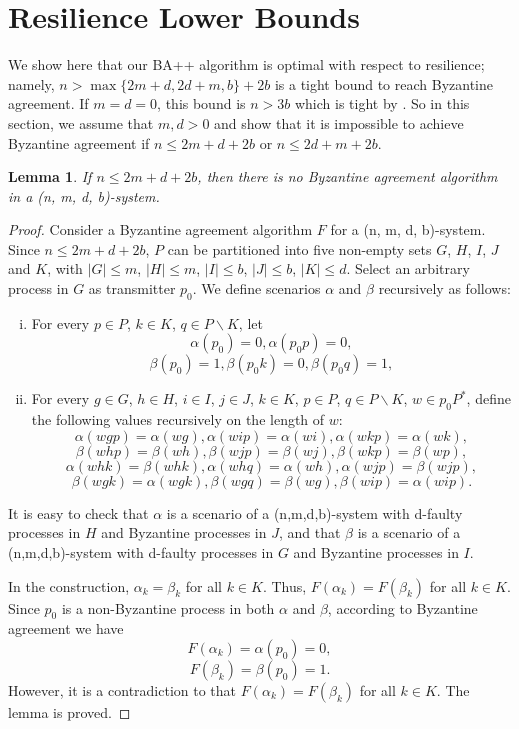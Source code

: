 \documentclass[11pt,conference,compsoc,onecolumn,romanappendices]{IEEEtran}
\newcommand{\nocomma}{}
\newenvironment{enumerateroman}{\begin{enumerate}[i.] }{\end{enumerate}}
\newtheorem{lemma}{Lemma}
\begin{document}
\section{Resilience Lower Bounds}\label{sec-resilience}

We show here that our BA++ algorithm is optimal  with
respect to resilience; namely, $n > \max \{2 m + d, 2 d + m, b\}+ 2 b$ is a
tight bound to reach Byzantine agreement. If $m = d = 0$, this bound is $n > 3 b$ which is tight by
\cite{lamport1982byzantine}. So in this section, we assume that $m, d > 0$ and
show that it is
impossible to achieve Byzantine agreement if $n \leqslant 2 m + d + 2 b$ or $n \leqslant 2 d + m + 2 b$.


\begin{lemma}\label{lemma-impsb1}
  If $n \leqslant 2 m + d + 2 b$, then there is no Byzantine
  agreement algorithm in a (n, m, d, b)-system.
\end{lemma}

\begin{proof}
  Consider a Byzantine agreement algorithm $F$ for a
  (n, m, d, b)-system. Since $n \leqslant 2 m + d + 2 b$, $P$ can be
  partitioned into five non-empty sets $G$, $H$, $I$, $J$ and $K$, with $| G |
  \leqslant m$, $| H | \leqslant m$, $| I | \leqslant b$, $| J | \leqslant b$,
  $| K | \leqslant d$. Select an arbitrary process in $G$ as transmitter
  $p_0$. We define scenarios $\alpha$ and $\beta$ recursively as follows:
  \smallskip
  \begin{enumerateroman}
    \item For every $p \in P$, $k \in K$, $q \in P \backslash K$, let
    \[ \alpha (p_0) = 0, \alpha (p_0 p) = 0, \]
    \[ \beta (p_0) = 1, \beta (p_0 k) = 0, \beta (p_0 q) = 1, \]
    \item For every $g \in G$, $h \in H$, $i \in I$, $j \in J$, $k \in K$, $p
    \in P$, $q \in P \backslash K$, $w \in p_0 P^{\ast}$, define the following values
    recursively on the length of $w$:
    \[ \alpha (w g p) = \alpha (w g) \nocomma, \alpha (w i p) = \alpha (w i),
       \alpha (w k p) = \alpha (w k), \]
    \[ \beta (w h p) = \beta (w h) \nocomma, \beta (w j p) = \beta (w j),
       \beta (w k p) = \beta (w p), \]
    \[ \alpha (w h k) = \beta (w h k) \nocomma, \alpha (w h q) = \alpha (w h),
       \alpha (w j p) = \beta (w j p) \nocomma, \text{} \]
    \[ \beta (w g k) = \alpha (w g k), \beta (w g q) = \beta (w g), \beta (w i
       p) = \alpha (w i p) . \]
  \end{enumerateroman}
  It is easy to check that $\alpha$ is a scenario of a (n,m,d,b)-system with d-faulty processes in $H$ and Byzantine processes in $J$, and that $\beta$ is a scenario of a (n,m,d,b)-system with d-faulty processes in $G$ and Byzantine processes in $I$.

  In the construction, $\alpha_k = \beta_k$ for all $k \in K$. Thus, $F (\alpha_k) = F (\beta_k)$ for all $k \in K$.
  Since $p_0$ is a non-Byzantine process in both $\alpha$ and $\beta$, according to Byzantine agreement we have
  \[ F (\alpha_k) = \alpha (p_0) = 0, \]
  \[ F (\beta_k) = \beta (p_0) = 1. \]
However, it is a contradiction to that $F (\alpha_k) = F (\beta_k)$ for all $k \in K$.
  The lemma is proved.
\end{proof}
\end{document}

